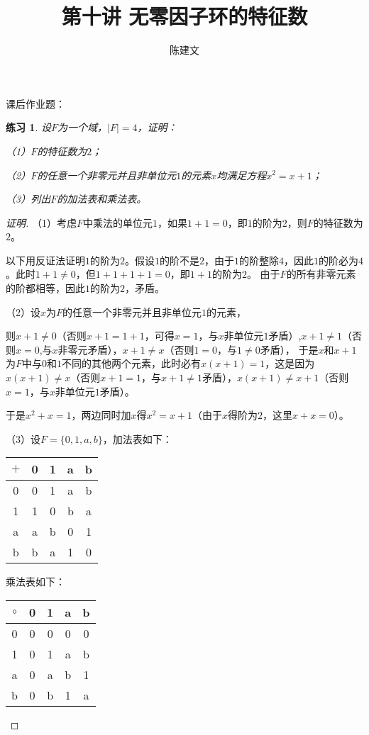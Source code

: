 \documentclass{article}
\newtheorem{Exercise}{练习}
\begin{document}
\begin{CJK*}{UTF8}{gbsn}
  \title{第十讲 无零因子环的特征数}
  \author{陈建文}
  \maketitle
  


课后作业题：
\begin{Exercise}
设$F$为一个域，$|F|=4$，证明：

（1）$F$的特征数为$2$；

（2）$F$的任意一个非零元并且非单位元$1$的元素$x$均满足方程$x^2=x+1$；

（3）列出$F$的加法表和乘法表。
\end{Exercise}
\begin{proof}[证明]

  （1）考虑$F$中乘法的单位元$1$，如果$1+1=0$，即$1$的阶为2，则$F$的特征数为$2$。

  以下用反证法证明$1$的阶为$2$。假设$1$的阶不是$2$，由于$1$的阶整除$4$，因此$1$的阶必为$4$。此时$1+1\neq 0$，但$1+1+1+1=0$，即$1+1$的阶为$2$。
  由于$F$的所有非零元素的阶都相等，因此$1$的阶为$2$，矛盾。

  （2）设$x$为$F$的任意一个非零元并且非单位元$1$的元素，

  则$x+1\neq 0$（否则$x+1=1+1$，可得$x=1$，与$x$非单位元$1$矛盾）,$x+1\neq 1$（否则$x=0$,与$x$非零元矛盾），$x+1\neq x$（否则$1=0$，与$1\neq 0$矛盾），
  于是$x$和$x+1$为$F$中与$0$和$1$不同的其他两个元素，此时必有$x(x+1)=1$，这是因为$x(x+1)\neq x$（否则$x+1=1$，与$x+1\neq 1$矛盾），$x(x+1)\neq x+1$（否则$x=1$，与$x$非单位元$1$矛盾）。

  于是$x^2+x=1$，两边同时加$x$得$x^2=x+1$（由于$x$得阶为$2$，这里$x+x=0$）。

  （3）设$F=\{0,1,a,b\}$，加法表如下：

  \begin{tabular}{c|cccc}
    $+$&0&1&a&b\\
    \hline
  0&0&1&a&b\\
  1&1&0&b&a\\
  a&a&b&0&1\\
  b&b&a&1&0\\
  \end{tabular}

  乘法表如下：

  \begin{tabular}{c|cccc}
    $\circ$&0&1&a&b\\
    \hline
  0&0&0&0&0\\
  1&0&1&a&b\\
  a&0&a&b&1\\
  b&0&b&1&a\\
  \end{tabular}

\end{proof}


\end{CJK*}
\end{document}

